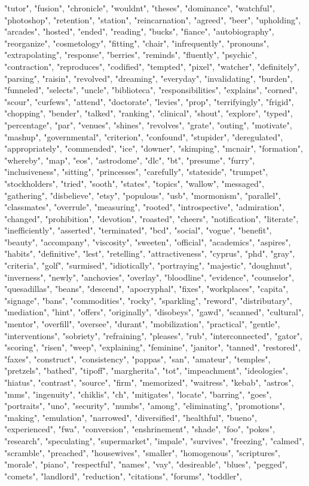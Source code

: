 "tutor", "fusion", "chronicle", "wouldnt", "theses", "dominance", "watchful", "photoshop", "retention", "station", "reincarnation", "agreed", "beer", "upholding", "arcades", "hosted", "ended", "reading", "bucks", "fiance", "autobiography", "reorganize", "cosmetology", "fitting", "chair", "infrequently", "pronouns", "extrapolating", "response", "berries", "reminds", "fluently", "psychic", "contraction", "reproduces", "codified", "tempted", "pixel", "watcher", "definitely", "parsing", "raisin", "revolved", "dreaming", "everyday", "invalidating", "burden", "funneled", "selects", "uncle", "biblioteca", "responsibilities", "explains", "corned", "scour", "curfews", "attend", "doctorate", "levies", "prop", "terrifyingly", "frigid", "chopping", "bender", "talked", "ranking", "clinical", "shout", "explore", "typed", "percentage", "par", "venues", "shines", "revolves", "grate", "outing", "motivate", "mashup", "governmental", "criterion", "confound", "stupider", "deregulated", "appropriately", "commended", "ice", "downer", "skimping", "mcnair", "formation", "whereby", "map", "eos", "astrodome", "dlc", "bt", "presume", "furry", "inclusiveness", "sitting", "princesses", "carefully", "stateside", "trumpet", "stockholders", "tried", "sooth", "states", "topics", "wallow", "messaged", "gathering", "disbelieve", "etsy", "populous", "usb", "mormonism", "parallel", "classmates", "overrule", "measuring", "rooted", "introspective", "admiration", "changed", "prohibition", "devotion", "roasted", "cheers", "notification", "literate", "inefficiently", "asserted", "terminated", "bcd", "social", "vogue", "benefit", "beauty", "accompany", "viscosity", "sweeten", "official", "academics", "aspires", "habits", "definitive", "lest", "retelling", "attractiveness", "cyprus", "phd", "gray", "criteria", "golf", "surmised", "idiotically", "portraying", "majestic", "doughnut", "inverness", "newly", "anchovies", "overlay", "bloodline", "evidence", "counselor", "quesadillas", "beans", "descend", "apocryphal", "fixes", "workplaces", "capita", "signage", "bans", "commodities", "rocky", "sparkling", "reword", "distributary", "mediation", "hint", "offers", "originally", "disobeys", "gawd", "scanned", "cultural", "mentor", "overfill", "oversee", "durant", "mobilization", "practical", "gentle", "interventions", "sobriety", "refraining", "pleases", "rub", "interconnected", "gator", "scoring", "risen", "weep", "explaining", "feminine", "janitor", "tanned", "restored", "faxes", "construct", "consistency", "pappas", "san", "amateur", "temples", "pretzels", "bathed", "tipoff", "margherita", "tot", "impeachment", "ideologies", "hiatus", "contrast", "source", "firm", "memorized", "waitress", "kebab", "astros", "mms", "ingenuity", "chiklis", "ch", "mitigates", "locate", "barring", "goes", "portraits", "uno", "security", "numbs", "among", "eliminating", "promotions", "making", "emulation", "narrowed", "diversified", "healthful", "bueno", "experienced", "fwa", "conversion", "enshrinement", "shade", "foo", "pokes", "research", "speculating", "supermarket", "impale", "survives", "freezing", "calmed", "scramble", "preached", "housewives", "smaller", "homogenous", "scriptures", "morale", "piano", "respectful", "names", "vay", "desireable", "blues", "pegged", "comets", "landlord", "reduction", "citations", "forums", "toddler", 
